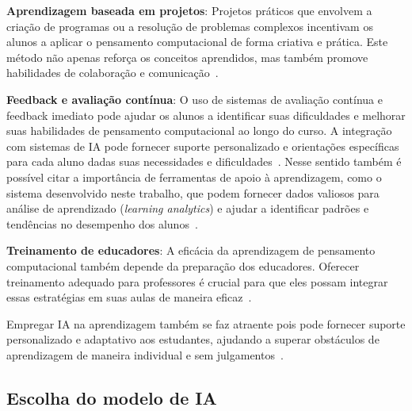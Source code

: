 \documentclass[journal]{IEEEtran}
\begin{document}
\noindent\textbf{Aprendizagem baseada em projetos}:
Projetos práticos que envolvem a criação de programas ou a resolução de problemas complexos incentivam os alunos a aplicar o pensamento computacional de forma criativa e prática.
Este método não apenas reforça os conceitos aprendidos, mas também promove habilidades de colaboração e comunicação~\cite{hong2020introduction,wef2019schools,giraffa2023ensino,oliveira_de_souza_2022}.

\noindent\textbf{Feedback e avaliação contínua}:
O uso de sistemas de avaliação contínua e feedback imediato pode ajudar os alunos a identificar suas dificuldades e melhorar suas habilidades de pensamento computacional ao longo do curso.
A integração com sistemas de IA pode fornecer suporte personalizado e orientações específicas para cada aluno dadas suas necessidades e dificuldades~\cite{jeon2023large,kasneci2023chatgpt,da2023chatgpt}.
Nesse sentido também é possível citar a importância de ferramentas de apoio à aprendizagem, como o sistema desenvolvido neste trabalho, que podem fornecer dados valiosos para análise de aprendizado (\textit{learning analytics}) e ajudar a identificar padrões e tendências no desempenho dos alunos~\cite{jeon2023large,bates2020can}.

\noindent\textbf{Treinamento de educadores}:
A eficácia da aprendizagem de pensamento computacional também depende da preparação dos educadores.
Oferecer treinamento adequado para professores é crucial para que eles possam integrar essas estratégias em suas aulas de maneira eficaz~\cite{kasneci2023chatgpt,jeon2023large}.

Empregar IA na aprendizagem também se faz atraente pois pode fornecer suporte personalizado e adaptativo aos estudantes, ajudando a superar obstáculos de aprendizagem de maneira individual e sem julgamentos~\cite{zawacki2019systematic,guzdial2015learner}.

\subsection{Escolha do modelo de IA}
\end{document}
